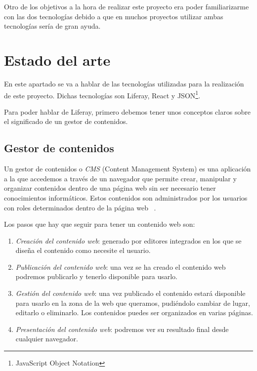 \documentclass[a4paper, 12pt]{book}
\begin{document}
Otro de los objetivos a la hora de realizar este proyecto era poder familiarizarme con las dos tecnologías debido a que en muchos proyectos utilizar ambas tecnologías sería de gran ayuda.


\chapter{Estado del arte} 
\label{sec:estado-del-arte}
En este apartado se va a hablar de las tecnologías utilizadas para la realización de este proyecto. Dichas tecnologías son Liferay, React y JSON\footnote{JavaScript Object Notation}.

Para poder hablar de Liferay, primero debemos tener unos conceptos claros sobre el significado de un gestor de contenidos.

\section{Gestor de contenidos}
\label{subsec:gestor-de-contenidos}
Un gestor de contenidos o \emph{CMS} (Content Management System) es una aplicación a la que accedemos a través de un navegador que permite crear, manipular y organizar contenidos dentro de una página web sin ser necesario tener conocimientos informáticos. Estos contenidos son administrados por los usuarios con roles determinados dentro de la página web ~\cite{cms_tech}.


\vspace{5mm}
Los pasos que hay que seguir para tener un contenido web son: 
\begin{enumerate}
    \item \emph{Creación del contenido web}: generado por editores integrados en los que se diseña el contenido como necesite el usuario.
    \item \emph{Publicación del contenido web}: una vez se ha creado el contenido web podremos publicarlo y tenerlo disponible para usarlo.
    \item \emph{Gestión del contenido web}: una vez publicado el contenido estará disponible para usarlo en la zona de la web que queramos, pudiéndolo cambiar de lugar, editarlo o eliminarlo. Los contenidos puedes ser organizados en varias páginas.
    \item \emph{Presentación del contenido web}: podremos ver su resultado final desde cualquier navegador.
\end{enumerate}
\end{document}
